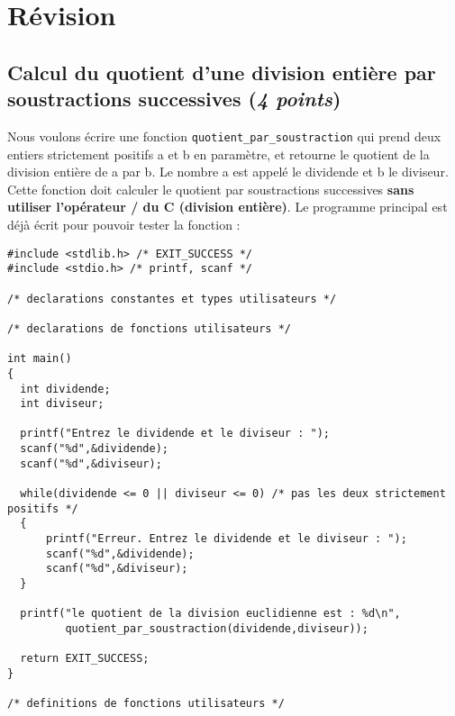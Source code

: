 \section{Révision}

\subsection{Calcul du quotient d'une division entière par soustractions
  successives (\textit{4 points})}

Nous voulons écrire une fonction \verb|quotient_par_soustraction| qui
prend deux entiers strictement positifs a et b en paramètre, et
retourne le quotient de la division entière de a par b. Le nombre a est
appelé le dividende et b le diviseur. Cette fonction doit calculer le
quotient par soustractions successives \textbf{sans utiliser
  l'opérateur / du C (division entière)}. Le programme principal
est déjà écrit pour pouvoir tester la fonction :
\begin{footnotesize}
\begin{verbatim}
#include <stdlib.h> /* EXIT_SUCCESS */
#include <stdio.h> /* printf, scanf */

/* declarations constantes et types utilisateurs */

/* declarations de fonctions utilisateurs */

int main()
{
  int dividende;
  int diviseur;

  printf("Entrez le dividende et le diviseur : ");
  scanf("%d",&dividende);
  scanf("%d",&diviseur);

  while(dividende <= 0 || diviseur <= 0) /* pas les deux strictement positifs */
  {
      printf("Erreur. Entrez le dividende et le diviseur : ");
      scanf("%d",&dividende);
      scanf("%d",&diviseur);
  }

  printf("le quotient de la division euclidienne est : %d\n",
         quotient_par_soustraction(dividende,diviseur));

  return EXIT_SUCCESS;
}

/* definitions de fonctions utilisateurs */
\end{verbatim}
\end{footnotesize}

